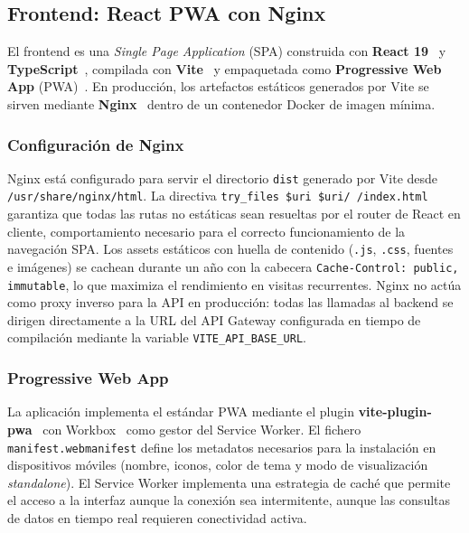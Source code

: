 \subsection{Frontend: React PWA con Nginx}
\label{subsec:frontend_impl}

El frontend es una \textit{Single Page Application} (SPA) construida con
\textbf{React 19}~\cite{react} y \textbf{TypeScript}~\cite{typescript}, compilada con
\textbf{Vite}~\cite{vite} y empaquetada como \textbf{Progressive Web App}
(PWA)~\cite{pwa_spec}. En producción, los artefactos estáticos generados por Vite se
sirven mediante \textbf{Nginx}~\cite{nginx} dentro de un contenedor Docker de imagen
mínima.

\subsubsection*{Configuración de Nginx}

Nginx está configurado para servir el directorio \texttt{dist} generado por Vite desde
\texttt{/usr/share/nginx/html}. La directiva \texttt{try\_files \$uri \$uri/ /index.html}
garantiza que todas las rutas no estáticas sean resueltas por el router de React en
cliente, comportamiento necesario para el correcto funcionamiento de la navegación SPA.
Los assets estáticos con huella de contenido (\texttt{.js}, \texttt{.css}, fuentes e
imágenes) se cachean durante un año con la cabecera
\texttt{Cache-Control: public, immutable}, lo que maximiza el rendimiento en visitas
recurrentes. Nginx no actúa como proxy inverso para la API en producción: todas las
llamadas al backend se dirigen directamente a la URL del API Gateway configurada en
tiempo de compilación mediante la variable \texttt{VITE\_API\_BASE\_URL}.

\subsubsection*{Progressive Web App}

La aplicación implementa el estándar PWA mediante el plugin
\textbf{vite-plugin-pwa}~\cite{vite_plugin_pwa} con Workbox~\cite{workbox} como gestor del
Service Worker. El fichero \texttt{manifest.webmanifest} define los metadatos necesarios
para la instalación en dispositivos móviles (nombre, iconos, color de tema y modo de
visualización \textit{standalone}). El Service Worker implementa una estrategia de caché
que permite el acceso a la interfaz aunque la conexión sea intermitente, aunque las
consultas de datos en tiempo real requieren conectividad activa.

